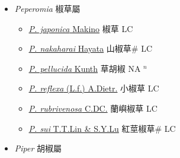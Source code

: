
  \begin{itemize}
 \item[] \textit{Peperomia} 椒草屬
                    
  \begin{itemize}
        \item[] \href{http://www.theplantlist.org/tpl1.1/search?q=Peperomia+japonica}{\textit{P. japonica} Makino}   椒草 LC
        \item[] \href{http://www.theplantlist.org/tpl1.1/search?q=Peperomia+nakaharai}{\textit{P. nakaharai} Hayata}   山椒草\# LC
        \item[] \href{http://www.theplantlist.org/tpl1.1/search?q=Peperomia+pellucida}{\textit{P. pellucida} Kunth}   草胡椒 NA $^n$
        \item[] \href{http://www.theplantlist.org/tpl1.1/search?q=Peperomia+reflexa}{\textit{P. reflexa} (L.f.) A.Dietr.}   小椒草 LC
        \item[] \href{http://www.theplantlist.org/tpl1.1/search?q=Peperomia+rubrivenosa}{\textit{P. rubrivenosa} C.DC.}   蘭嶼椒草 LC
        \item[] \href{http://www.theplantlist.org/tpl1.1/search?q=Peperomia+sui}{\textit{P. sui} T.T.Lin \& S.Y.Lu}   紅莖椒草\# LC
  \end{itemize}
 \item[] \textit{Piper} 胡椒屬
                    

\end{itemize}

